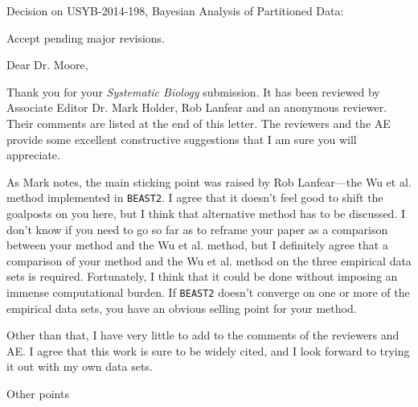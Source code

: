 \documentclass[10pt]{article}
\begin{document}
\begin{flushleft}
Decision on USYB-2014-198, Bayesian Analysis of Partitioned Data:

Accept pending major revisions.

\bigskip
Dear Dr. Moore,
\medskip

Thank you for your \emph{Systematic Biology} submission. It has been reviewed by Associate Editor Dr. Mark Holder, Rob Lanfear and an anonymous reviewer. Their comments are listed at the end of this letter. The reviewers and the AE provide some excellent constructive suggestions that I am sure you will appreciate.

\medskip
As Mark notes, the main sticking point was raised by Rob Lanfear---the Wu et al. method implemented in \verb!BEAST2!. I agree that it doesn't feel good to shift the goalposts on you here, but I think that alternative method has to be discussed. I don't know if you need to go so far as to reframe your paper as a comparison between your method and the Wu et al. method, but I definitely agree that a comparison of your method and the Wu et al. method on the three empirical data sets is required. Fortunately, I think that it could be done without imposing an immense computational burden. If \verb!BEAST2! doesn't converge on one or more of the empirical data sets, you have an obvious selling point for your method.

\medskip
Other than that, I have very little to add to the comments of the reviewers and AE. I agree that this work is sure to be widely cited, and I look forward to trying it out with my own data sets.

\medskip
Other points


\end{flushleft}
\end{document}
